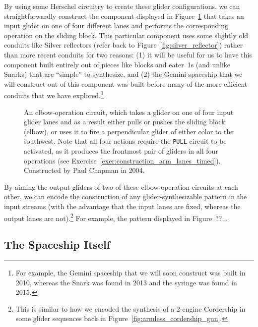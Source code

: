 By using some Herschel circuitry to create these glider configurations, we can straightforwardly construct the component displayed in Figure~\ref{fig:construction_arm} that takes an input glider on one of four different lanes and performs the corresponding operation on  the sliding block. This particular component uses some slightly old conduits like Silver reflectors (refer back to Figure~\ref{fig:silver_reflector}) rather than more recent conduits for two reasons: (1) it will be useful for us to have this component built entirely out of pieces like blocks and eater~1s (and unlike Snarks) that are ``simple'' to synthesize, and (2) the Gemini spaceship that we will construct out of this component was built before many of the more efficient conduits that we have explored.\footnote{For example, the Gemini spaceship that we will soon construct was built in 2010, whereas the Snark was found in 2013 and the syringe was found in 2015.}

\begin{figure}[!htb]
	\centering
	\caption{An elbow-operation circuit, which takes a glider on one of four input glider lanes and as a result either pulls or pushes the sliding block (elbow), or uses it to fire a perpendicular glider of either color to the southwest. Note that all four actions require the \texttt{PULL} circuit to be activated, as it produces the frontmost pair of gliders in all four operations (see Exercise~\ref{exer:construction_arm_lanes_timed}). Constructed by Paul Chapman in 2004.}\label{fig:construction_arm}
\end{figure}

By aiming the output gliders of two of these elbow-operation circuits at each other, we can encode the construction of any glider-synthesizable pattern in the input streams (with the advantage that the input lanes are fixed, whereas the output lanes are not).\footnote{This is similar to how we encoded the synthesis of a $2$-engine Cordership in some glider sequences back in Figure~\ref{fig:armless_cordership_gun}.} For example, the pattern displayed in Figure~??...



\subsection{The Spaceship Itself}\label{sec:gemini_itself}

